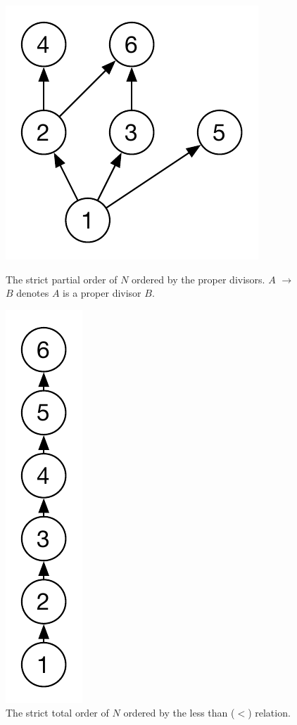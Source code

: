 		\begin{figure}[H]
		\centering
		\begin{minipage}{0.45\textwidth}
			\centering
			\includegraphics[height=\textheight/5]{2background/images/strict-partial.pdf}
		\caption{The strict partial order of $N$ ordered by the proper divisors. $A$ $\rightarrow$ $B$ denotes $A$ is a proper divisor $B$.}
		\label{fig:background:strict-partial}
		\end{minipage}\hfill
		\begin{minipage}{0.45\textwidth}
			\centering
			\includegraphics[height=\textheight/5]{2background/images/strict-total.pdf}
		\caption{The strict total order of $N$ ordered by the less than ($<$) relation.}
		\label{fig:background:strict-total}
		\end{minipage}
		\end{figure}
		
